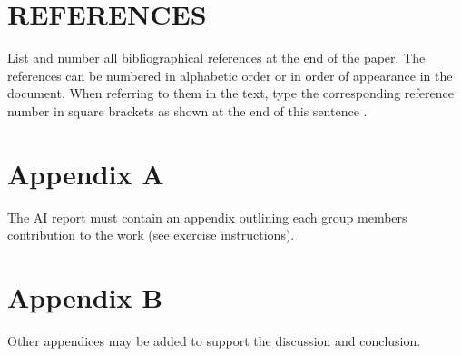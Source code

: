 \documentclass{article}
\begin{document}
\section{REFERENCES}
\label{sec:ref}

List and number all bibliographical references at the end of the paper.  The references can be numbered in alphabetic order or in order of appearance in the document.  When referring to them in the text, type the corresponding reference number in square brackets as shown at the end of this sentence \cite{C2}.




\section{Appendix A}
The AI report must contain an appendix outlining each group members contribution to the work (see exercise instructions). 

\section{Appendix B}
Other appendices may be added to support the discussion and conclusion. 
\end{document}
